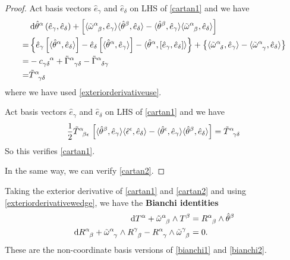 \documentclass[10pt]{article}
\begin{document}
\begin{proof}
    Act basis vectors $\hat{e}_\gamma$ and $\hat{e}_\delta$ on LHS of \eqref{cartan1} and we have
    \begin{align}
          & \dd{\hat{\theta}^\alpha}\left(\hat{e}_\gamma,\hat{e}_\delta\right)+\left[\langle\tensor{\tilde{\omega}}{^\alpha_\beta},\hat{e}_\gamma\rangle\langle\hat{\theta}^\beta,\hat{e}_\delta\rangle-\langle\hat{\theta}^\beta,\hat{e}_\gamma\rangle\langle\tensor{\tilde{\omega}}{^\alpha_\beta},\hat{e}_\delta\rangle\right]\notag                                                                                   \\
        = & \left\{\hat{e}_\gamma\left[\langle\hat{\theta}^\alpha,\hat{e}_\delta\rangle\right]-\hat{e}_\delta\left[\langle\hat{\theta}^\alpha,\hat{e}_\gamma\rangle\right]-\langle\hat{\theta}^\alpha,\comm{\hat{e}_\gamma}{\hat{e}_\delta}\rangle\right\}+\left\{\langle\tensor{\tilde{\omega}}{^\alpha_\delta},\hat{e}_\gamma\rangle-\langle\tensor{\tilde{\omega}}{^\alpha_\gamma},\hat{e}_\delta\rangle\right\}\notag \\
        = & -\tensor{c}{_\gamma_\delta^\alpha}+\tensor{\tilde{\Gamma}}{^\alpha_\gamma_\delta}-\tensor{\tilde{\Gamma}}{^\alpha_\delta_\gamma}\notag                                                                                                                                                                                                                                                                        \\
        = & \tensor{\tilde{T}}{^\alpha_\gamma_\delta}
    \end{align}
    where we have used \eqref{exteriorderivativeuse}.

    Act basis vectors $\hat{e}_\gamma$ and $\hat{e}_\delta$ on LHS of \eqref{cartan1} and we have
    \begin{align}
        \frac{1}{2}\tensor{\tilde{T}}{^\alpha_\beta_\epsilon}\left[\langle\hat{\theta}^\beta,\hat{e}_\gamma\rangle\langle\hat{\epsilon}^\epsilon,\hat{e}_\delta\rangle-\langle\hat{\theta}^\epsilon,\hat{e}_\gamma\rangle\langle\hat{\theta}^\beta,\hat{e}_\delta\rangle\right]=\tensor{\tilde{T}}{^\alpha_\gamma_\delta}
    \end{align}
    So this verifies \eqref{cartan1}.

    In the same way, we can verify \eqref{cartan2}.
\end{proof}
Taking the exterior derivative of \eqref{cartan1} and \eqref{cartan2} and using \eqref{exteriorderivativewedge}, we have the \textbf{Bianchi identities}
\begin{align}
    \dd{T^\alpha}+\tensor{\tilde{\omega}}{^\alpha_\beta}\wedge T^\beta                                                                                                           & =\tensor{R}{^\alpha_\beta}\wedge\hat{\theta}^\beta \\
    \dd{\tensor{R}{^\alpha_\beta}}+\tensor{\tilde{\omega}}{^\alpha_\gamma}\wedge\tensor{R}{^\gamma_\beta}-\tensor{R}{^\alpha_\gamma}\wedge\tensor{\tilde{\omega}}{^\gamma_\beta} & =0.
\end{align}
These are the non-coordinate basis versions of \eqref{bianchi1} and \eqref{bianchi2}.
\end{document}

